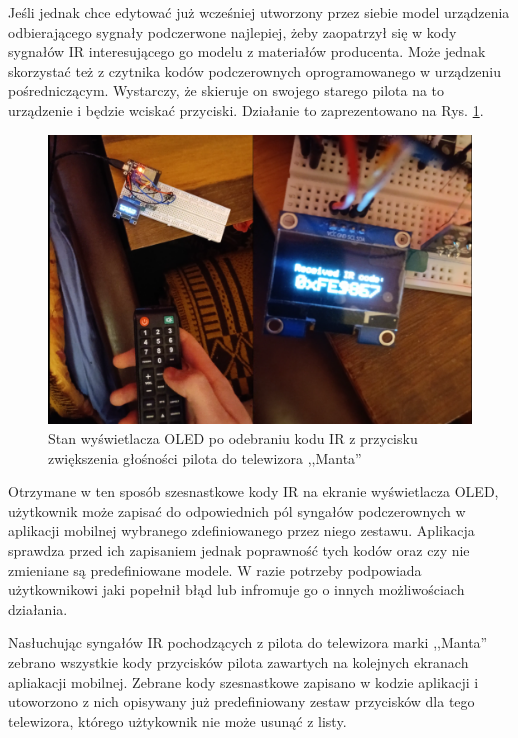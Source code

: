\documentclass[12pt,twoside,draft]{article}
\begin{document}
Jeśli jednak chce edytować już wcześniej utworzony przez siebie model urządzenia odbierającego sygnały podczerwone najlepiej, żeby zaopatrzył się w kody sygnałów IR interesującego go modelu z materiałów producenta. Może jednak skorzystać też z czytnika kodów podczerownych oprogramowanego w urządzeniu pośredniczącym. Wystarczy, że skieruje on swojego starego pilota na to urządzenie i będzie wciskać przyciski. Działanie to zaprezentowano na Rys. \ref*{Fig:irCodeRemote}.

\begin{figure}[ht]
   \centering
   \includegraphics[width=14cm]{images/irCodeRemote.png}
   \caption{Stan wyświetlacza OLED po odebraniu kodu IR z przycisku zwiększenia głośności pilota do telewizora ,,Manta''}
   \label{Fig:irCodeRemote}
\end{figure}

 Otrzymane w ten sposób szesnastkowe kody IR na ekranie wyświetlacza OLED, użytkownik może zapisać do odpowiednich pól syngałów podczerownych w aplikacji mobilnej wybranego zdefiniowanego przez niego zestawu. Aplikacja sprawdza przed ich zapisaniem jednak poprawność tych kodów oraz czy nie zmieniane są predefiniowane modele. W razie potrzeby podpowiada użytkownikowi jaki popełnił błąd lub infromuje go o innych możliwościach działania.

 Nasłuchując syngałów IR pochodzących z pilota do telewizora marki ,,Manta'' zebrano wszystkie kody przycisków pilota zawartych na kolejnych ekranach apliakacji mobilnej. Zebrane kody szesnastkowe zapisano w kodzie aplikacji i utoworzono z nich opisywany już predefiniowany zestaw przycisków dla tego telewizora, którego użtykownik nie może usunąć z listy.
\end{document}
